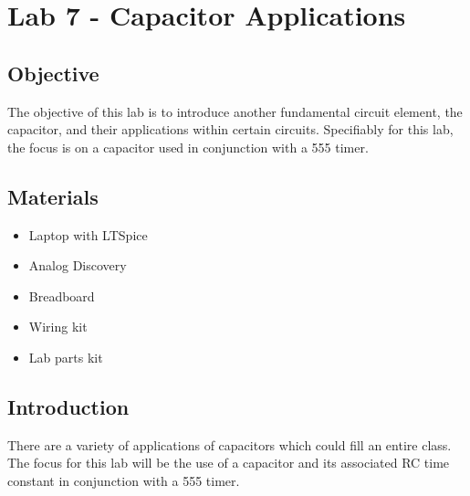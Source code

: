 \chapter{Lab 7 - Capacitor Applications}

\section{Objective}

The objective of this lab is to introduce another fundamental circuit element, the capacitor, and their applications within certain circuits. Specifiably for this lab, the focus is on a capacitor used in conjunction with a 555 timer. 

\section{Materials}

\begin{itemize}
	\item Laptop with LTSpice
	\item Analog Discovery
	\item Breadboard
	\item Wiring kit
	\item Lab parts kit 
\end{itemize}

\section{Introduction}

There are a variety of applications of capacitors which could fill an entire class. The focus for this lab will be the use of a capacitor and its associated RC time constant in conjunction with a 555 timer. 

